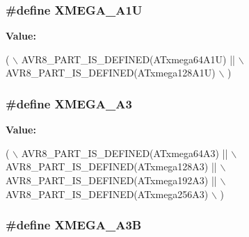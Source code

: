 \hypertarget{group__xmega__part__macros__group_ga6672329ddee03af905aa378946568b67}{
\subsubsection[{X\-M\-E\-G\-A\-\_\-\-A1\-U}]{\setlength{\rightskip}{0pt plus 5cm}\#define X\-M\-E\-G\-A\-\_\-\-A1\-U}}\label{group__xmega__part__macros__group_ga6672329ddee03af905aa378946568b67}
{\bfseries Value\-:}
\begin{DoxyCode}
( \(\backslash\)
        AVR8\_PART\_IS\_DEFINED(ATxmega64A1U)  || \(\backslash\)
        AVR8\_PART\_IS\_DEFINED(ATxmega128A1U) \(\backslash\)
        )
\end{DoxyCode}
\hypertarget{group__xmega__part__macros__group_ga831948bd467aa2355eb76ec708d2921a}{
\subsubsection[{X\-M\-E\-G\-A\-\_\-\-A3}]{\setlength{\rightskip}{0pt plus 5cm}\#define X\-M\-E\-G\-A\-\_\-\-A3}}\label{group__xmega__part__macros__group_ga831948bd467aa2355eb76ec708d2921a}
{\bfseries Value\-:}
\begin{DoxyCode}
( \(\backslash\)
        AVR8\_PART\_IS\_DEFINED(ATxmega64A3)  || \(\backslash\)
        AVR8\_PART\_IS\_DEFINED(ATxmega128A3) || \(\backslash\)
        AVR8\_PART\_IS\_DEFINED(ATxmega192A3) || \(\backslash\)
        AVR8\_PART\_IS\_DEFINED(ATxmega256A3) \(\backslash\)
        )
\end{DoxyCode}
\hypertarget{group__xmega__part__macros__group_ga32fef354d7f092b04ec41a0733e2c7ae}{
\subsubsection[{X\-M\-E\-G\-A\-\_\-\-A3\-B}]{\setlength{\rightskip}{0pt plus 5cm}\#define X\-M\-E\-G\-A\-\_\-\-A3\-B}}\label{group__xmega__part__macros__group_ga32fef354d7f092b04ec41a0733e2c7ae}
